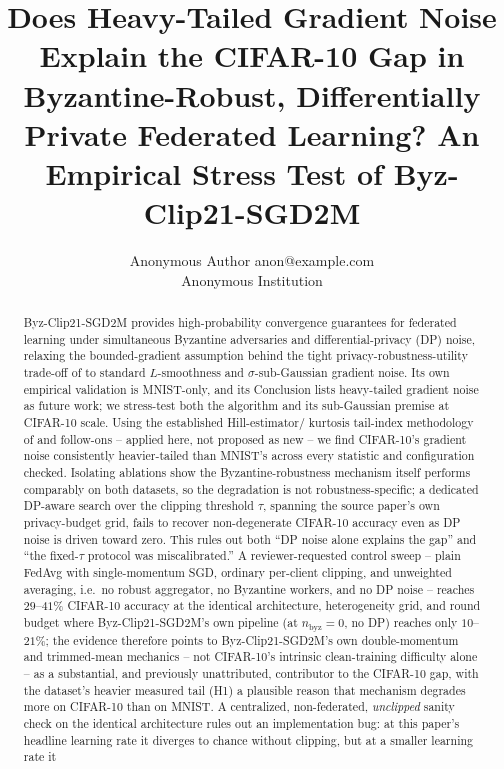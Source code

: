 \documentclass{article}
\title{Does Heavy-Tailed Gradient Noise Explain the CIFAR-10 Gap in Byzantine-Robust, Differentially Private Federated Learning? An Empirical Stress Test of Byz-Clip21-SGD2M}
\author{\name Anonymous Author \email anon@example.com \\
        \addr Anonymous Institution}
\begin{document}
\maketitle

\begin{abstract}
Byz-Clip21-SGD2M \citep{islamov2026byzclip} provides high-probability convergence
guarantees for federated learning under simultaneous Byzantine adversaries and
differential-privacy (DP) noise, relaxing the bounded-gradient assumption behind
the tight privacy-robustness-utility trade-off of \citet{allouah2023trilemma} to
standard $L$-smoothness and $\sigma$-sub-Gaussian gradient noise. Its own
empirical validation is MNIST-only, and its Conclusion lists heavy-tailed
gradient noise as future work; we stress-test both the algorithm and its
sub-Gaussian premise at CIFAR-10 scale. Using the established Hill-estimator/
kurtosis tail-index methodology of \citet{simsekli2019tailindex} and follow-ons
-- applied here, not proposed as new -- we find CIFAR-10's gradient noise
consistently heavier-tailed than MNIST's across every statistic and
configuration checked. Isolating ablations show the Byzantine-robustness
mechanism itself performs comparably on both datasets, so the degradation is
not robustness-specific; a dedicated DP-aware search over the clipping
threshold $\tau$, spanning the source paper's own privacy-budget grid, fails
to recover non-degenerate CIFAR-10 accuracy even as DP noise is driven toward
zero. This rules out both ``DP noise alone explains the gap'' and ``the
fixed-$\tau$ protocol was miscalibrated.'' A reviewer-requested control
sweep -- plain FedAvg with single-momentum SGD, ordinary per-client clipping,
and unweighted averaging, i.e.\ no robust aggregator, no Byzantine workers,
and no DP noise -- reaches $29$--$41\%$ CIFAR-10 accuracy at the identical
architecture, heterogeneity grid, and round budget where Byz-Clip21-SGD2M's
own pipeline (at $n_{\text{byz}}{=}0$, no DP) reaches only $10$--$21\%$; the
evidence therefore points to Byz-Clip21-SGD2M's own double-momentum and
trimmed-mean mechanics -- not CIFAR-10's intrinsic clean-training difficulty
alone -- as a substantial, and previously unattributed, contributor to the
CIFAR-10 gap, with the dataset's heavier measured tail (H1) a plausible
reason that mechanism degrades more on CIFAR-10 than on MNIST. A centralized,
non-federated, \emph{unclipped} sanity check on the identical architecture
rules out an implementation bug: at this paper's headline learning rate it
diverges to chance without clipping, but at a smaller learning rate it

\end{abstract}
\end{document}
